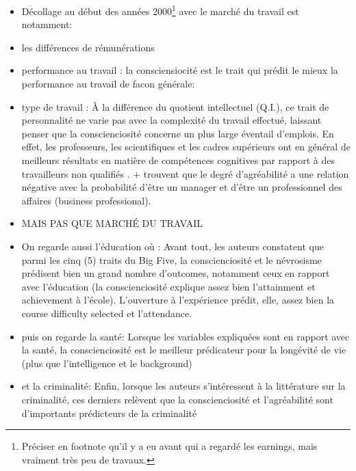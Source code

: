 \documentclass[a4paper, 11pt, onecolumn]{article}
\begin{document}
\begin{itemize}
\item Décollage au début des années 2000\footnote{Préciser en footnote qu'il y a eu \cite{Bowles1976} avant qui a regardé les earnings, mais vraiment très peu de travaux.} avec le marché du travail est notamment:
\item[1] les différences de rémunérations \citep{Bowles2001} \citep{Heckman2006}  \citep{Cawley2001}
\item[2] performance au travail : la consciensiocité est le trait qui prédit le mieux la performance au travail de facon générale: \citep{Nyhus2005} \citep{Salgado1997} \citep{Hogan2003} \citep{Barrick1991}
\item[3] type de travail : À la différence du quotient intellectuel (Q.I.), ce trait de personnalité ne varie pas avec la complexité du travail effectué, laissant penser que la conscienciosité concerne un plus large éventail d’emplois. En effet, les professeurs, les scientifiques et les cadres supérieurs ont en général de meilleurs résultats en matière de compétences cognitives par rapport à des travailleurs non qualifiés \citep{Schmidt2004} \citep{Almlund2011} \citep{Barrick1991}. + \citep{CobbClark2011} trouvent que le degré d’agréabilité a une relation négative avec la probabilité d’être un manager et d’être un professionnel des affaires (business professional).
\item MAIS PAS QUE MARCHÉ DU TRAVAIL
\item On regarde aussi l'éducation où \cite{Almlund2011} : Avant tout, les auteurs constatent que parmi les cinq (5) traits du Big Five, la conscienciosité et le névrosisme prédisent bien un grand nombre d’outcomes, notamment ceux en rapport avec l’éducation (la conscienciosité explique assez bien l’attainment et achievement à l’école). L’ouverture à l’expérience prédit, elle, assez bien la course difficulty selected et l’attendance. 
\item puis on regarde la santé: Lorsque les variables expliquées sont en rapport avec la santé, la conscienciosité est le meilleur prédicateur pour la longévité de vie (plus que l’intelligence et le background) \citep{Almlund2011}
\item et la criminalité: Enfin, lorsque les auteurs s’intéressent à la littérature sur la criminalité, ces derniers relèvent que la conscienciosité et l’agréabilité sont d’importants prédicteurs de la criminalité \citep{Almlund2011} 
\end{itemize}
\end{document}
